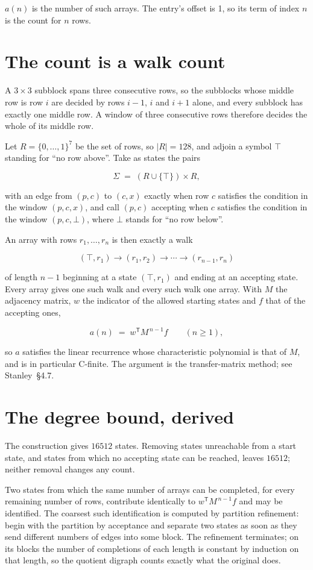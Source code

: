 \documentclass[11pt]{article}
\theoremstyle{definition}
\begin{document}
$a(n)$ is the number of such arrays. The entry's offset is 1, so its term of index $n$ is the count for $n$ rows.

\section{The count is a walk count}

A $3 \times 3$ subblock spans three consecutive rows, so the subblocks whose middle row is row $i$ are decided by rows $i-1$, $i$ and $i+1$ alone, and every subblock has exactly one middle row. A window of three consecutive rows therefore decides the whole of its middle row.

Let $R = \{0,\dots,1\}^{7}$ be the set of rows, so $|R| = 128$, and adjoin a symbol $\top$ standing for ``no row above''. Take as states the pairs

\[\Sigma \;=\; (R \cup \{\top\}) \times R,\]

with an edge from $(p,c)$ to $(c,x)$ exactly when row $c$ satisfies the condition in the window $(p,c,x)$, and call $(p,c)$ accepting when $c$ satisfies the condition in the window $(p,c,\bot)$, where $\bot$ stands for ``no row below''.

An array with rows $r_1,\dots,r_n$ is then exactly a walk

\[(\top,r_1) \to (r_1,r_2) \to \cdots \to (r_{n-1},r_n)\]

of length $n-1$ beginning at a state $(\top,r_1)$ and ending at an accepting state. Every array gives one such walk and every such walk one array. With $M$ the adjacency matrix, $w$ the indicator of the allowed starting states and $f$ that of the accepting ones,

\[a(n) \;=\; w^{\mathsf T} M^{\,n-1} f \qquad (n \ge 1),\]

so $a$ satisfies the linear recurrence whose characteristic polynomial is that of $M$, and is in particular C-finite. The argument is the transfer-matrix method; see Stanley~\S4.7.

\section{The degree bound, derived}

The construction gives $16512$ states. Removing states unreachable from a start state, and states from which no accepting state can be reached, leaves $16512$; neither removal changes any count.

Two states from which the same number of arrays can be completed, for every remaining number of rows, contribute identically to $w^{\mathsf T}M^{\,n-1}f$ and may be identified. The coarsest such identification is computed by partition refinement: begin with the partition by acceptance and separate two states as soon as they send different numbers of edges into some block. The refinement terminates; on its blocks the number of completions of each length is constant by induction on that length, so the quotient digraph counts exactly what the original does.
\end{document}
